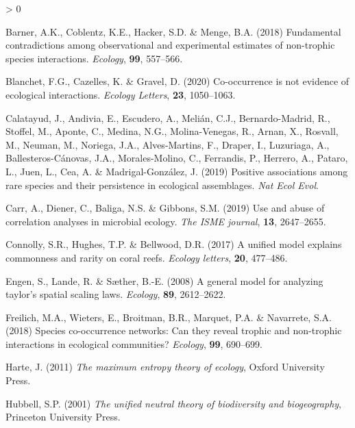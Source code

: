 \documentclass[
]{article}
\newlength{\cslhangindent}
\newenvironment{CSLReferences}[2] %
 {%
  \setlength{\parindent}{0pt}
  \ifodd #1 \everypar{\setlength{\hangindent}{\cslhangindent}}\ignorespaces\fi
  \ifnum #2 > 0
  \setlength{\parskip}{#2\baselineskip}
  \fi
 }%
 {}
\begin{document}
\hypertarget{refs}{}
\begin{CSLReferences}{1}{0}
\leavevmode\hypertarget{ref-barner2018}{}%
Barner, A.K., Coblentz, K.E., Hacker, S.D. \& Menge, B.A. (2018)
Fundamental contradictions among observational and experimental
estimates of non-trophic species interactions. \emph{Ecology},
\textbf{99}, 557--566.

\leavevmode\hypertarget{ref-blanchet2020}{}%
Blanchet, F.G., Cazelles, K. \& Gravel, D. (2020) Co-occurrence is not
evidence of ecological interactions. \emph{Ecology Letters},
\textbf{23}, 1050--1063.

\leavevmode\hypertarget{ref-calatayud2019}{}%
Calatayud, J., Andivia, E., Escudero, A., Melián, C.J., Bernardo-Madrid,
R., Stoffel, M., Aponte, C., Medina, N.G., Molina-Venegas, R., Arnan,
X., Rosvall, M., Neuman, M., Noriega, J.A., Alves-Martins, F., Draper,
I., Luzuriaga, A., Ballesteros-Cánovas, J.A., Morales-Molino, C.,
Ferrandis, P., Herrero, A., Pataro, L., Juen, L., Cea, A. \&
Madrigal-González, J. (2019) Positive associations among rare species
and their persistence in ecological assemblages. \emph{Nat Ecol Evol}.

\leavevmode\hypertarget{ref-carr2019}{}%
Carr, A., Diener, C., Baliga, N.S. \& Gibbons, S.M. (2019) Use and abuse
of correlation analyses in microbial ecology. \emph{The ISME journal},
\textbf{13}, 2647--2655.

\leavevmode\hypertarget{ref-connolly2017}{}%
Connolly, S.R., Hughes, T.P. \& Bellwood, D.R. (2017) A unified model
explains commonness and rarity on coral reefs. \emph{Ecology letters},
\textbf{20}, 477--486.

\leavevmode\hypertarget{ref-engen2008}{}%
Engen, S., Lande, R. \& Sæther, B.-E. (2008) A general model for
analyzing taylor's spatial scaling laws. \emph{Ecology}, \textbf{89},
2612--2622.

\leavevmode\hypertarget{ref-freilich2018}{}%
Freilich, M.A., Wieters, E., Broitman, B.R., Marquet, P.A. \& Navarrete,
S.A. (2018) Species co-occurrence networks: Can they reveal trophic and
non-trophic interactions in ecological communities? \emph{Ecology},
\textbf{99}, 690--699.

\leavevmode\hypertarget{ref-harte2011}{}%
Harte, J. (2011) \emph{The maximum entropy theory of ecology}, Oxford
University Press.

\leavevmode\hypertarget{ref-hubbell2001}{}%
Hubbell, S.P. (2001) \emph{The unified neutral theory of biodiversity
and biogeography}, Princeton University Press.


\end{CSLReferences}
\end{document}
